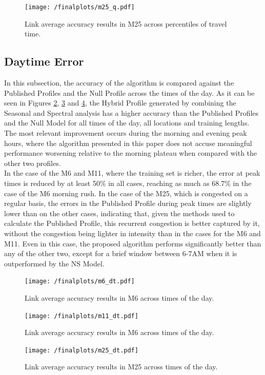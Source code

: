 \documentclass[conference]{IEEEtran}
\begin{document}
\begin{figure}[htbp]
	\centering
	\texttt{[image: /finalplots/m25\_q.pdf]}
	\caption{Link average accuracy results in M25 across percentiles of travel time.}
	\label{fig:m25q}
\end{figure}

\subsection{Daytime Error}
In this subsection, the accuracy of the algorithm is compared against the Published Profiles and the Null Profile across the times of the day.
As it can be seen in Figures \ref{fig:m6daytime}, \ref{fig:m11daytime} and \ref{fig:m25daytime}, the Hybrid Profile generated by combining the Seasonal and Spectral analysis has a higher accuracy than the Published Profiles and the Null Model for all times of the day, all locations and training lengths. 
The most relevant improvement occurs during the morning and evening peak hours, where the algorithm presented in this paper does not accuse meaningful performance worsening relative to the morning plateau when compared with the other two profiles.\\
In the case of the M6 and M11, where the training set is richer, the error at peak times is reduced by at least 50\% in all cases, reaching as much as 68.7\% in the case of the M6 morning rush.
In the case of the M25, which is congested on a regular basis, the errors in the Published Profile during peak times are slightly lower than on the other cases, indicating that, given the methods used to calculate the Published Profile, this recurrent congestion is better captured by it, without the congestion being lighter in intensity than in the cases for the M6 and M11. 
Even in this case, the proposed algorithm performs significantly better than any of the other two, except for a brief window between 6-7AM when it is outperformed by the NS Model.
\begin{figure}[htbp]
	\centering
		\texttt{[image: /finalplots/m6\_dt.pdf]}
	\caption{Link average accuracy results in M6 across times of the day.}
	\label{fig:m6daytime}
\end{figure}

\begin{figure}[htbp]
	\centering
	\texttt{[image: /finalplots/m11\_dt.pdf]}
	\caption{Link average accuracy results in M6 across times of the day.}
	\label{fig:m11daytime}
\end{figure}

\begin{figure}[htbp]
	\centering
	\texttt{[image: /finalplots/m25\_dt.pdf]}
	\caption{Link average accuracy results in M25 across times of the day.}
	\label{fig:m25daytime}
\end{figure}
\end{document}
